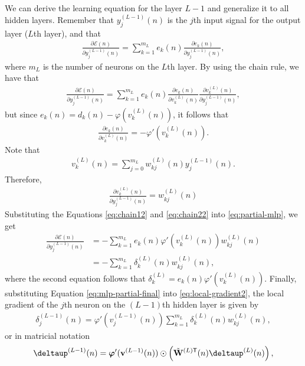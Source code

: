 \documentclass[12pt,a4paper]{article}
\newcommand{\trans}{\mathsf{T}}
\begin{document}
We can derive the learning equation for the layer \(L-1\) and generalize it to all hidden layers. Remember that \(y_{j}^{(L-1)}(n)\) is the \(j\)th input signal for the output layer (\(L\)th layer), and that
\begin{align}
    \frac{\partial \mathscr{E}(n)}{\partial y_{j}^{(L-1)}(n)} = \sum_{k=1}^{m_L} e_k(n) \frac{\partial e_k(n)}{\partial y_{j}^{(L-1)}(n)},
\end{align}
where \(m_L\) is the number of neurons on the \(L\)th layer. By using the chain rule, we have that
\begin{align}
    \frac{\partial \mathscr{E}(n)}{\partial y_{j}^{(L-1)}(n)} = \sum_{k=1}^{m_L} e_k(n) \frac{\partial e_k(n)}{\partial v_{k}^{(L)}(n)} \frac{\partial v_{k}^{(L)}(n)}{\partial y_{j}^{(L-1)}(n)},
    \label{eq:partial-mlp}
\end{align}
but since \(e_k(n) = d_k(n) - \varphi(v_k^{(L)}(n))\), it follows that
\begin{align}
    \frac{\partial e_k(n)}{\partial v_{k}^{(L)}(n)} = - \varphi'(v_k^{(L)}(n)).
    \label{eq:chain12}
\end{align}
Note that
\begin{align}
    v_{k}^{(L)}(n) = \sum_{j=0}^{m_L} w_{kj}^{(L)}(n) y_{j}^{(L-1)}(n).
\end{align}
Therefore,
\begin{align}
    \frac{\partial v_{k}^{(L)}(n)}{\partial y_{j}^{(L-1)}(n)} = w_{kj}^{(L)}(n)
    \label{eq:chain22}
\end{align}
Substituting the Equations \eqref{eq:chain12} and \eqref{eq:chain22} into \eqref{eq:partial-mlp}, we get
\begin{align}
    \frac{\partial \mathscr{E}(n)}{\partial y_{j}^{(L-1)}(n)}  & = - \sum_{k=1}^{m_L} e_k(n) \varphi'(v_k^{(L)}(n)) w_{kj}^{(L)}(n) \nonumber \\
    & = - \sum_{k=1}^{m_L} \delta_k^{(L)} (n) w_{kj}^{(L)}(n),
    \label{eq:mlp-partial-final}
\end{align}
where the second equation follows that \(\delta_k^{(L)} = e_k(n) \varphi'(v_k^{(L)}(n))\). Finally, substituting Equation \eqref{eq:mlp-partial-final} into \eqref{eq:local-gradient2}, the local gradient of the \(j\)th neuron on the \((L-1)\)th hidden layer is given by
\begin{align}
    \delta_j^{(L-1)} (n) = \varphi'(v_j^{(L-1)}(n)) \sum_{k=1}^{m_L} \delta_k^{(L)} (n) w_{kj}^{(L)}(n),
\end{align}
or in matricial notation
\begin{align}
    \boldsymbol{\deltaup}^{(L-1)} (n) = \boldsymbol{\varphi}'(\mathbf{v}^{(L-1)}(n)) \odot \left( \tilde{\mathbf{W}}^{(L)\trans}(n) \boldsymbol{\deltaup}^{(L)} (n) \right),
    \label{eq:uptade-layer-L-1}
\end{align}
\end{document}

